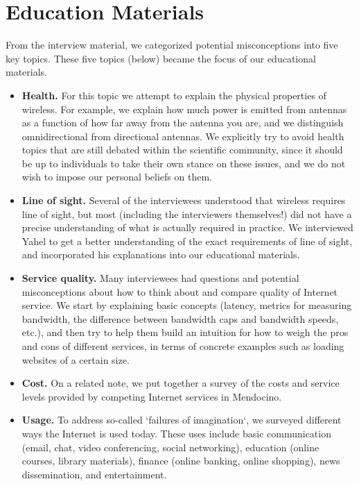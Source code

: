 \section{Education Materials}
\label{sec:education-materials}

From the interview material, we categorized potential misconceptions into
five key topics. These five topics (below) became the focus of our educational
materials.

\begin{itemize}
\item \textbf{Health.} For this topic we attempt to explain the physical
properties of wireless. For example, we explain how much power is emitted
from antennas as a function of how far away from the antenna you are, and we
distinguish omnidirectional from directional antennas. We explicitly try to
avoid health topics that are still debated within the scientific community,
since it should be up to individuals to take their own stance on these issues,
and we do not wish to impose our personal beliefs on them.
\item \textbf{Line of sight.} Several of the interviewees understood that
wireless requires line of sight, but most (including the interviewers
themselves!) did not have a precise understanding of what is actually required
in practice. We interviewed Yahel to get a better understanding of the exact
requirements of line of sight, and incorporated his explanations into our
educational materials.
\item \textbf{Service quality.} Many interviewees had questions and
potential misconceptions about how to think about and compare
quality of Internet service. We start by explaining basic concepts
(latency, metrics for measuring bandwidth, the difference between bandwidth caps and
bandwidth speeds, etc.), and then try to help them build an intuition for how
to weigh the pros and cons of different services, in terms of concrete examples such
as loading websites of a certain size.
\item \textbf{Cost.} On a related note, we put together a survey of the costs
and service levels provided by competing Internet services in Mendocino.
\item \textbf{Usage.} To address so-called `failures of imagination`, we
surveyed different ways the Internet is used today. These uses include basic
communication (email, chat, video conferencing, social networking), education
(online courses, library materials), finance (online banking, online
shopping), news dissemination, and entertainment.
\end{itemize}

